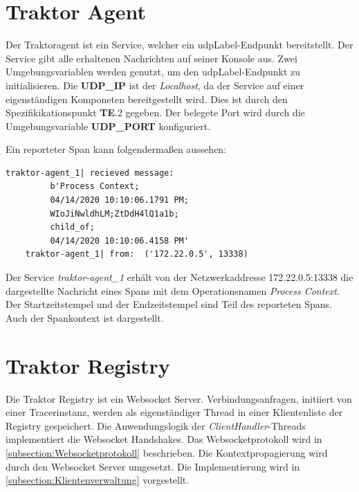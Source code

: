 \section{Traktor Agent}
\label{section:Traktor Agent}

Der Traktoragent ist ein Service, welcher ein \gls{udpLabel}-Endpunkt bereitstellt. Der Service gibt alle erhaltenen Nachrichten auf seiner Konsole aus. Zwei Umgebungsvariablen werden genutzt, um den \gls{udpLabel}-Endpunkt zu initialisieren. Die \textbf{UDP\_IP} ist der \emph{Localhost}, da der Service auf einer eigenständigen Komponeten bereitgestellt wird. Dies ist durch den Spezifikikationspunkt \textbf{TE}.2  gegeben. Der belegete Port wird durch die Umgebungsvariable \textbf{UDP\_PORT} konfiguriert. 

Ein reporteter Span kann folgendermaßen aussehen:

\begin{minipage}[]{\textwidth}
	\begin{lstlisting}[frame=trBL]
	traktor-agent_1| recieved message: 
		 b'Process Context;
		 04/14/2020 10:10:06.1791 PM;
		 WIoJiNwldhLM;ZtDdH4lQ1a1b;
		 child_of;
		 04/14/2020 10:10:06.4158 PM'
	traktor-agent_1| from:  ('172.22.0.5', 13338)
	\end{lstlisting}
	\label{listing:Reporteter-Span}
\end{minipage} 

Der Service \emph{traktor-agent\_1} erhält von der Netzwerkaddresse 172.22.0.5:13338 die dargestellte Nachricht eines Spans mit dem Operationsnamen \emph{Process Context}. Der Startzeitstempel und der Endzeitstempel sind Teil des reporteten Spans. Auch der Spankontext ist dargestellt.

\section{Traktor Registry}
\label{section:Traktor Registry}

Die Traktor Registry ist ein Websocket Server. Verbindungsanfragen, initiiert von einer Tracerinstanz, werden als eigenständiger Thread in einer Klientenliste der Registry gespeichert. Die Anwendungslogik der \emph{ClientHandler}-Threads implementiert die Websocket Handshakes. Das Websocketprotokoll wird in \cref{subsection:Websocketprotokoll} beschrieben. Die Kontextpropagierung wird durch den Websocket Server umgesetzt. Die Implementierung wird in \cref{subsection:Klientenverwaltung} vorgestellt.

